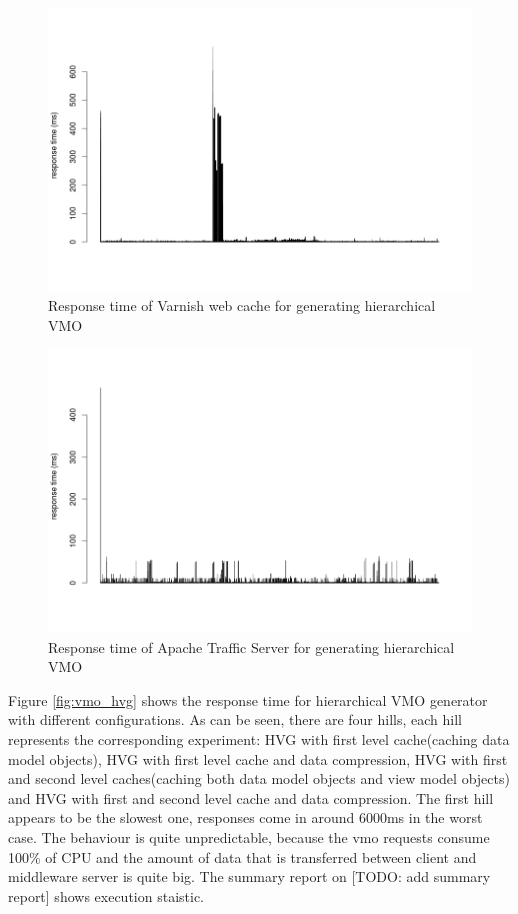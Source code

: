 \begin{figure}[h]
    \centering
    \includegraphics[width=\textwidth]{images/vmo_varnish_mult.png}
    \caption{Response time of Varnish web cache for generating hierarchical VMO}
    \label{fig:vmo_varnish_mult}
\end{figure}


\begin{figure}[h]
    \centering
    \includegraphics[width=\textwidth]{images/vmo_ts_mult.png}
    \caption{Response time of Apache Traffic Server for generating hierarchical VMO}
    \label{fig:vmo_ts_mult}
\end{figure}

Figure \ref{fig:vmo_hvg} shows the response time for hierarchical VMO generator with different configurations. As can be seen, there are four hills, each hill represents the corresponding experiment: HVG with first level cache(caching data model objects), HVG with first level cache and data compression, HVG with first and second level caches(caching both data model objects and view model objects) and HVG with first and second level cache and data compression. The first hill appears to be the slowest one, responses come in around 6000ms in the worst case. The behaviour is quite unpredictable, because the vmo requests consume 100\% of CPU and the amount of data that is transferred between client and middleware server is quite big. The summary report on [TODO: add summary report] shows execution staistic.

